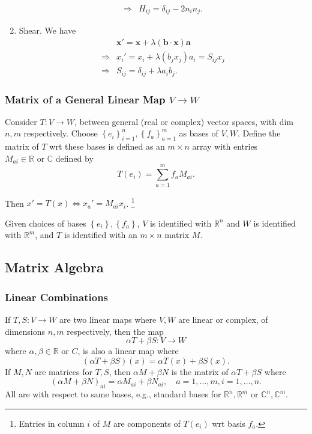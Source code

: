 \documentclass[a4paper]{article}
\begin{document}
\begin{example}
\begin{enumerate}[(1)]
\[\begin{aligned}
          \Longrightarrow & H_{ij}=\delta_{ij}-2n_in_j.
        \end{aligned}
      \]
    \item Shear. We have
      \[
        \begin{aligned}
          &\mathbf{x}'=\mathbf{x}+\lambda(\mathbf{b}\cdot
          \mathbf{x})\mathbf{a}\\
          \Longrightarrow & x_i'=x_i+\lambda(b_jx_j)a_i=S_{ij}x_j\\
          \Longrightarrow & S_{ij}=\delta_{ij}+\lambda a_i b_j.
        \end{aligned}
      \]
  \end{enumerate}
\end{example}
\subsubsection{Matrix of a General Linear Map $ V\to W $}
\begin{definition}
  Consider $ T:V\to W $, between general (real or complex) vector
  spaces, with dim $n,m$ respectively. Choose $ \left\{
  e_i\right\}_{i=1}^n, \left\{ f_a\right\}_{a=1}^m $ as bases of $
  V,W $. Define the matrix of $T$ wrt these bases is defined as an
  $m\times n$ array with entries $ M_{ai}\in \mathbb{R}\text{ or
  }\mathbb{C}  $ defined by
  \[
    T(e_i)=\sum_{a=1}^{m}f_a M_{ai}
  .\]
\end{definition}
Then $ x'=T(x) \Leftrightarrow x_a'=M_{ai}x_i $.
\footnote{Entries in column $i$ of $M$ are components of $T(e_i)$ wrt
basis $f_a$.}
\begin{remark}
  Given choices of bases $ \left\{ e_i\right\},\left\{ f_a\right\} $,
  $V$ is identified with $ \mathbb{R}^{n} $ and $W$ is identified
  with $ \mathbb{R}^{m} $, and $T$ is identified with an $m \times n$
  matrix $M$.
\end{remark}
\subsection{Matrix Algebra}
\subsubsection{Linear Combinations}
If $ T,S:V\to W $ are two linear maps where $ V,W $ are linear or
complex, of dimensions $ n,m $ respectively, then the map
\[
  \alpha T+\beta S: V\to W
\]
where $ \alpha,\beta\in \mathbb{R} $ or $C$, is also a linear map where
\[
  (\alpha T+\beta S)(x)=\alpha T(x)+\beta S(x)
.\]
If $ M,N $ are matrices for $ T,S $, then $ \alpha M+\beta N $ is the
matrix of $\alpha T+\beta S$ where
\[
  (\alpha M+\beta N)_{ai}=\alpha M_{ai}+\beta N_{ai},\quad
  a=1,\dots,m, i=1,\dots,n
.\]
All are with respect to same bases, e.g., standard bases for $
\mathbb{R}^{n},\mathbb{R}^{m} $ or $ \mathbb{C}^{n},\mathbb{C}^{m} $.
\end{document}
